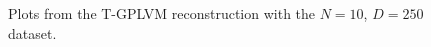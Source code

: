 \begin{figure}[t]
\begin{subfigure}[r]{0.3\textwidth}
	\end{subfigure}
	\caption[Y-$\hat{Y}$ pair plots for N=10 with the T-GPLVM model]{Plots from the T-GPLVM reconstruction with the $N=10$, $D=250$ dataset.}
	\label{fig:T-Gplvm_pairs}
\end{figure} 